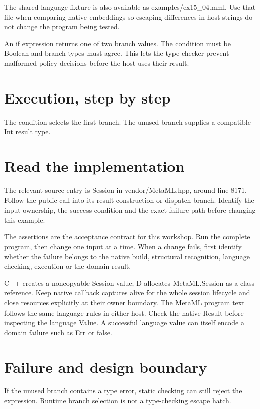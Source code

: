 The shared language fixture is also available as examples/ex15\_04.mml. Use that file when comparing native embeddings so escaping differences in host strings do not change the program being tested.

\clearpage
{}
An if expression returns one of two branch values. The condition must be Boolean and branch types must agree. This lets the type checker prevent malformed policy decisions before the host uses their result.


\section*{Execution, step by step}
The condition selects the first branch. The unused branch supplies a compatible Int result type.

\section*{Read the implementation}
The relevant source entry is Session in vendor/MetaML.hpp, around line 8171. Follow the public call into its result construction or dispatch branch. Identify the input ownership, the success condition and the exact failure path before changing this example.

The assertions are the acceptance contract for this workshop. Run the complete program, then change one input at a time. When a change fails, first identify whether the failure belongs to the native build, structural recognition, language checking, execution or the domain result.

\clearpage
{}
C++ creates a noncopyable Session value; D allocates MetaML.Session as a class reference. Keep native callback captures alive for the whole session lifecycle and close resources explicitly at their owner boundary. The MetaML program text follows the same language rules in either host. Check the native Result before inspecting the language Value. A successful language value can itself encode a domain failure such as Err or false.


\section*{Failure and design boundary}
If the unused branch contains a type error, static checking can still reject the expression. Runtime branch selection is not a type-checking escape hatch.

